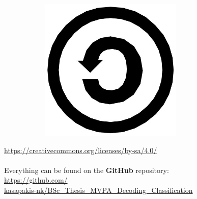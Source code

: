 \begin{frame}
\begin{figure}
\begin{subfigure}[b]{0.25\textwidth}
    \end{subfigure}
    \begin{subfigure}[b]{0.25\textwidth}
        \centering
        \includegraphics[width=0.75\textwidth]{assets/sa.jpg}
    \end{subfigure}
\end{figure}
\begin{center}
    \href{https://creativecommons.org/licenses/by-sa/4.0/}{https://creativecommons.org/licenses/by-sa/4.0/}
    \\~\\
    Everything can be found on the \textbf{GitHub} repository:\\
    \href{https://github.com/kasapakis-nk/BSc\_Thesis\_MVPA\_Decoding\_Classification}{https://github.com/\\kasapakis-nk/BSc\_Thesis\_MVPA\_Decoding\_Classification}
\end{center}
\end{frame}

